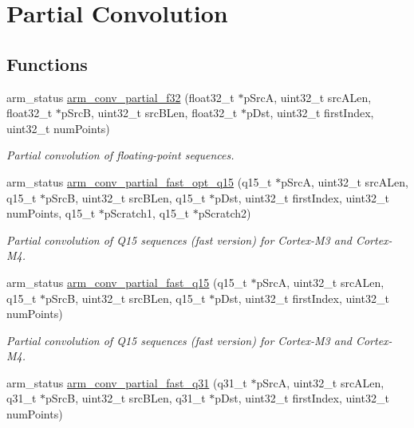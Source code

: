 \hypertarget{group__PartialConv}{}\section{Partial Convolution}
\label{group__PartialConv}
\subsection*{Functions}
\begin{DoxyCompactItemize}
\item 
arm\+\_\+status \hyperlink{group__PartialConv_ga16d10f32072cd79fc5fb6e785df45f5e}{arm\+\_\+conv\+\_\+partial\+\_\+f32} (float32\+\_\+t $\ast$p\+SrcA, uint32\+\_\+t src\+A\+Len, float32\+\_\+t $\ast$p\+SrcB, uint32\+\_\+t src\+B\+Len, float32\+\_\+t $\ast$p\+Dst, uint32\+\_\+t first\+Index, uint32\+\_\+t num\+Points)
\begin{DoxyCompactList}\small\item\em Partial convolution of floating-\/point sequences. \end{DoxyCompactList}\item 
arm\+\_\+status \hyperlink{group__PartialConv_ga3de9c4ddcc7886de25b70d875099a8d9}{arm\+\_\+conv\+\_\+partial\+\_\+fast\+\_\+opt\+\_\+q15} (q15\+\_\+t $\ast$p\+SrcA, uint32\+\_\+t src\+A\+Len, q15\+\_\+t $\ast$p\+SrcB, uint32\+\_\+t src\+B\+Len, q15\+\_\+t $\ast$p\+Dst, uint32\+\_\+t first\+Index, uint32\+\_\+t num\+Points, q15\+\_\+t $\ast$p\+Scratch1, q15\+\_\+t $\ast$p\+Scratch2)
\begin{DoxyCompactList}\small\item\em Partial convolution of Q15 sequences (fast version) for Cortex-\/\+M3 and Cortex-\/\+M4. \end{DoxyCompactList}\item 
arm\+\_\+status \hyperlink{group__PartialConv_ga1e4d43385cb62262a78c6752fe1fafb2}{arm\+\_\+conv\+\_\+partial\+\_\+fast\+\_\+q15} (q15\+\_\+t $\ast$p\+SrcA, uint32\+\_\+t src\+A\+Len, q15\+\_\+t $\ast$p\+SrcB, uint32\+\_\+t src\+B\+Len, q15\+\_\+t $\ast$p\+Dst, uint32\+\_\+t first\+Index, uint32\+\_\+t num\+Points)
\begin{DoxyCompactList}\small\item\em Partial convolution of Q15 sequences (fast version) for Cortex-\/\+M3 and Cortex-\/\+M4. \end{DoxyCompactList}\item 
arm\+\_\+status \hyperlink{group__PartialConv_ga10c5294cda8c4985386f4e3944be7650}{arm\+\_\+conv\+\_\+partial\+\_\+fast\+\_\+q31} (q31\+\_\+t $\ast$p\+SrcA, uint32\+\_\+t src\+A\+Len, q31\+\_\+t $\ast$p\+SrcB, uint32\+\_\+t src\+B\+Len, q31\+\_\+t $\ast$p\+Dst, uint32\+\_\+t first\+Index, uint32\+\_\+t num\+Points)

\end{DoxyCompactItemize}
